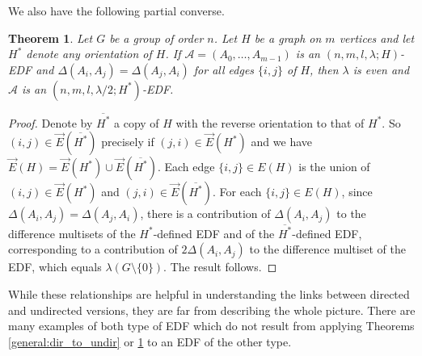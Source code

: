\documentclass[12pt, a4paper]{article}
\newtheorem{theorem}{Theorem}[section]
\theoremstyle{definition}
\newcommand{\E}{\overrightarrow{E}}
\begin{document}
We also have the following partial converse.

\begin{theorem}\label{general:ij=ji}
Let $G$ be a group of order $n$.  Let $H$ be a graph on $m$ vertices and let $H^*$ denote any orientation of $H$.
If $\mathcal{A}=(A_0,\ldots, A_{m-1})$ is an $(n,m,l,\lambda;H)$-EDF and $\Delta(A_i,A_j)=\Delta(A_j,A_i)$ for all edges $\{i,j\}$ of $H$, then $\lambda$ is even and $\mathcal{A}$ is an $(n,m,l,\lambda/2;H^*)$-EDF.
\end{theorem}
\begin{proof} 
Denote by $\overline{H^*}$ a copy of $H$ with the reverse orientation to that of $H^*$. So $(i,j) \in \E(\overline{H^*})$ precisely if $(j,i) \in \E(H^*)$ and we have ${\E}(H)=\overrightarrow{E}(H^*)\cup\overrightarrow{E}(\overline{H^*})$.  Each edge $\{i,j\} \in E(H)$ is the union of $(i,j) \in \overrightarrow{E}(H^*)$ and $(j,i) \in \overrightarrow{E}(\overline{H^*})$. For each $\{i,j\} \in E(H)$, since $\Delta(A_i,A_j)=\Delta(A_j,A_i)$, there is a contribution of $\Delta(A_i,A_j)$ to the difference multisets of the $H^*$-defined EDF and of the $\overline{H^*}$-defined EDF, corresponding to a contribution of $2 \Delta(A_i,A_j)$ to the difference multiset of the EDF, which equals $\lambda(G \setminus \{0\})$. The result follows.
\end{proof}

While these relationships are helpful in understanding the links between directed and undirected versions, they are far from describing the whole picture.  There are many examples of both type of EDF which do not result from applying Theorems \ref{general:dir_to_undir} or \ref{general:ij=ji} to an EDF of the other type.
\end{document}
